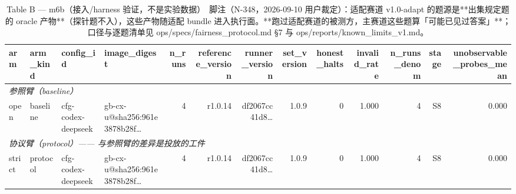 \begin{table}[t]
\centering
\caption{Table B — m6b（接入/harness 验证，不是实验数据）　脚注（N-348，2026-09-10 用户裁定）：适配赛道 v1.0-adapt 的题源是**出集规定题的 oracle 产物**（探针题不入），这些产物随适配 bundle 进入执行面。**跑过适配赛道的被测方，主赛道这些题算「可能已见过答案」**；口径与逐题清单见 ops/specs/fairness\_protocol.md §7 与 ops/reports/known\_limits\_v1.md。}
\label{tab:b-m6b}
\begin{tabular}{llllrrrrrrrrr}
\toprule
arm & arm\_kind & config\_id & image\_digest & n\_runs & reference\_version & runner\_version & set\_version & honest\_halts & invalid\_rate & n\_runs\_denom & stage & unobservable\_probes\_mean \\
\midrule
\multicolumn{13}{l}{\textit{参照臂（baseline）}} \\
open & baseline & cfg-codex-deepseek & gb-cx-u@sha256:961e3878b28f… & 4 & r1.0.14 & df2067cc41d8… & 1.0.9 & 0 & 1.000 & 4 & S8 & 0.000 \\
\midrule
\multicolumn{13}{l}{\textit{协议臂（protocol）—— 与参照臂的差异是投放的工件}} \\
strict & protocol & cfg-codex-deepseek & gb-cx-u@sha256:961e3878b28f… & 4 & r1.0.14 & df2067cc41d8… & 1.0.9 & 0 & 1.000 & 4 & S8 & 0.000 \\
\bottomrule
\end{tabular}
\end{table}

